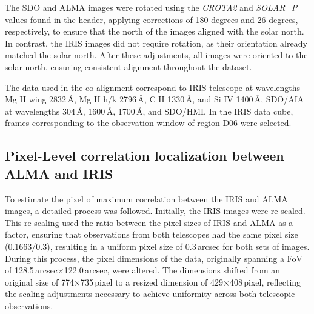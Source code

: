 \documentclass[a4paper,alpha-refs]{eSpectra}
\begin{document}
    


The SDO and ALMA images were rotated using the \textit{CROTA2} \cite[See Table 1,][]{brown_working_nodate}
and \textit{SOLAR\_P} \cite[See Table A.2,][]{SALSA_guia}
values found in the header, applying corrections of 180 degrees and 26 degrees, respectively, to ensure that the north of the images aligned with the solar north. 
In contrast, the IRIS images did not require rotation, as their orientation already matched the solar north. After these adjustments, all images were oriented to the solar north, ensuring consistent alignment throughout the dataset.

The data used in the co-alignment correspond to  IRIS telescope at wavelengths Mg II wing 2832\,Å, Mg II h/k 2796\,Å, C II 1330\,Å, and Si IV 1400\,Å, SDO/AIA at wavelengths 304\,Å, 1600\,Å, 1700\,Å,  and  SDO/HMI. In the IRIS data cube, frames corresponding to the observation window of region D06 were selected.



\subsection{Pixel-Level correlation localization between ALMA and IRIS}
\label{alma-IRIS_correlation_process}

To estimate the pixel of maximum correlation between the IRIS and ALMA images, a detailed process was followed. Initially, the IRIS images were re-scaled. This re-scaling used the ratio between the pixel sizes of IRIS and ALMA as a factor, ensuring that observations from both telescopes had the same pixel size (0.1663/0.3), resulting in a uniform pixel size of 0.3\,arcsec for both sets of images. During this process, the pixel dimensions of the data, originally spanning a FoV of 128.5\,arcsec$\times$122.0\,arcsec, were altered. The dimensions shifted from an original size of 774$\times$735\,pixel to a resized dimension of 429$\times$408\,pixel, reflecting the scaling adjustments necessary to achieve uniformity across both telescopic observations.
\end{document}
